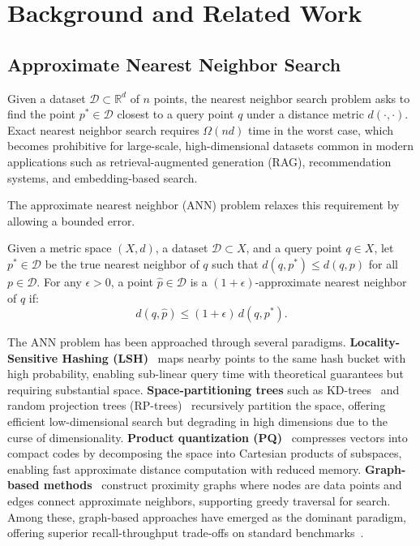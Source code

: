 \section{Background and Related Work}
\label{sec:related}

\subsection{Approximate Nearest Neighbor Search}
\label{sec:ann}

Given a dataset $\mathcal{D} \subset \mathbb{R}^d$ of $n$ points, the nearest neighbor search problem asks to find the point $p^* \in \mathcal{D}$ closest to a query point $q$ under a distance metric $d(\cdot, \cdot)$.
Exact nearest neighbor search requires $\Omega(nd)$ time in the worst case, which becomes prohibitive for large-scale, high-dimensional datasets common in modern applications such as retrieval-augmented generation (RAG), recommendation systems, and embedding-based search.

The approximate nearest neighbor (ANN) problem relaxes this requirement by allowing a bounded error.

\begin{definition}
\label{def:epsilon-ann}
Given a metric space $(X, d)$, a dataset $\mathcal{D} \subset X$, and a query point $q \in X$, let $p^* \in \mathcal{D}$ be the true nearest neighbor of $q$ such that $d(q, p^*) \le d(q, p)$ for all $p \in \mathcal{D}$. For any $\epsilon > 0$, a point $\hat{p} \in \mathcal{D}$ is a $(1+\epsilon)$-approximate nearest neighbor of $q$ if:
\begin{equation}
d(q, \hat{p}) \le (1 + \epsilon) \, d(q, p^*).
\end{equation}
\end{definition}

The ANN problem has been approached through several paradigms.
\textbf{Locality-Sensitive Hashing (LSH)}~\cite{indyk1998,datar2004} maps nearby points to the same hash bucket with high probability, enabling sub-linear query time with theoretical guarantees but requiring substantial space.
\textbf{Space-partitioning trees} such as KD-trees~\cite{bentley1975} and random projection trees (RP-trees)~\cite{dasgupta2008} recursively partition the space, offering efficient low-dimensional search but degrading in high dimensions due to the curse of dimensionality.
\textbf{Product quantization (PQ)}~\cite{jegou2011pq} compresses vectors into compact codes by decomposing the space into Cartesian products of subspaces, enabling fast approximate distance computation with reduced memory.
\textbf{Graph-based methods}~\cite{malkov2020,dong2011} construct proximity graphs where nodes are data points and edges connect approximate neighbors, supporting greedy traversal for search.
Among these, graph-based approaches have emerged as the dominant paradigm, offering superior recall-throughput trade-offs on standard benchmarks~\cite{annbenchmarks}.

